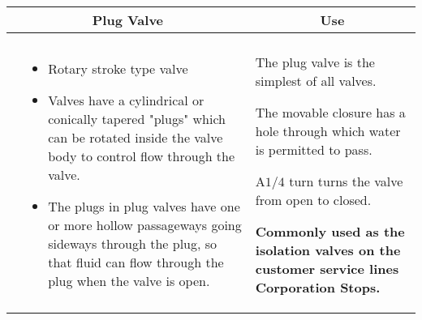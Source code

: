 \begin{landscape}
\begin{table}
\begin{tabular}{| m{7cm} m{10cm} | m{7cm} | }
\multicolumn{2}{c}{Plug Valve} & \multicolumn{1}{c}{Use} \\ \hline
    \begin{minipage}{.3\textwidth}
   \vspace{-2em} 
     \texttt{[image: PlugValve1.png]}\\
    \end{minipage}
    &
  \scriptsize{\begin{itemize}[topsep=5pt, partopsep=0pt]
  \item Rotary stroke type valve \item Valves have a cylindrical or conically tapered "plugs" which can be rotated inside the valve body to control flow through the valve. \item The plugs in plug valves have one or more hollow passageways going sideways through the plug, so that fluid can flow through the plug when the valve is open.
  \end{itemize}}  
    &
        \vspace{0.4cm}
      \begin{itemize}[leftmargin=*]
      \scriptsize{
        \item The plug valve is the simplest of all valves. \item The movable closure has a hole through which water is permitted to pass. \item $\mathrm{A} 1 / 4$ turn turns the valve from open to closed. \item \textbf{Commonly used as the isolation valves on the customer service lines Corporation Stops.} }
      \end{itemize}
  

\end{tabular}
\end{table}
\end{landscape}
